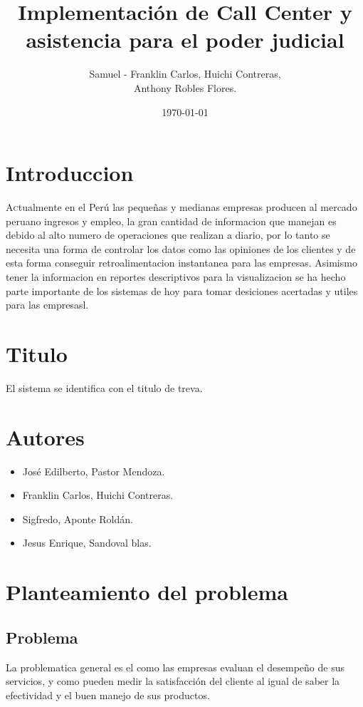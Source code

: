 \documentclass[twoside,twocolumn]{article}
\title{Implementación de Call Center y asistencia para el poder judicial}
\author{Samuel  - Franklin Carlos, Huichi Contreras, \\
Anthony Robles Flores. }
\date{\today}
\begin{document}
\maketitle


\section{Introduccion}
\lettrine[nindent=0em,lines=3]{A}ctualmente en el Perú las pequeñas y medianas empresas producen al mercado peruano ingresos y empleo, la gran cantidad de informacion que manejan es debido al alto numero de operaciones que realizan a diario, por lo tanto se necesita una forma de controlar los datos como las opiniones de los clientes y de esta forma conseguir retroalimentacion instantanea para las empresas. Asimismo tener la informacion en reportes descriptivos para la visualizacion se ha hecho parte importante de los sistemas de hoy para tomar desiciones acertadas y utiles para las empresasl.

\section{Titulo}
El sistema se identifica con el titulo de treva.

\section{Autores}
\begin{itemize}
\item José Edilberto, Pastor Mendoza.
\item Franklin Carlos, Huichi Contreras.
\item Sigfredo, Aponte Roldán.
\item Jesus Enrique, Sandoval blas.
\end{itemize}

\section{Planteamiento del problema}
\subsection{Problema}
La problematica general es el como las empresas evaluan el desempeño de sus servicios, y como pueden medir la satisfacción del cliente al igual de saber la efectividad y el buen manejo de sus productos.
\end{document}
